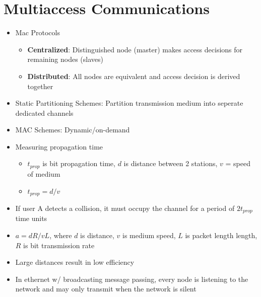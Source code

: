 \documentclass{article}
\begin{document}
    \section{Multiaccess Communications}
    \begin{itemize}
        \item Mac Protocols
        \begin{itemize}
            \item \textbf{Centralized}: Distinguished node (master) makes access decisions for remaining nodes (slaves)
            \item \textbf{Distributed}: All nodes are equivalent and access decision is derived together
        \end{itemize}
        \item Static Partitioning Schemes: Partition transmission medium into seperate dedicated channels
        \item MAC Schemes: Dynamic/on-demand
        \item Measuring propagation time
        \begin{itemize}
            \item $t_{prop}$ is bit propagation time, $d$ is distance between 2 stations, $v$ = speed of medium
            \item $t_{prop} = d/v$
        \end{itemize}
        \item If user A detects a collision, it must occupy the channel for a period of $2t_{prop}$ time units
        \item $a = dR/vL$, where $d$ is distance, $v$ is medium speed, $L$ is packet length length, $R$ is bit transmission rate
        \item Large distances result in low efficiency
        \item In ethernet w/ broadcasting message passing, every node is listening to the network and may only transmit when the network is silent
    \end{itemize}
\end{document}
